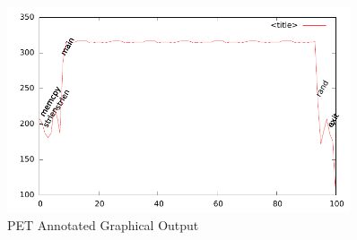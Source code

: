 \begin{figure}[htb]
    \centering
    \includegraphics[width=0.9\textwidth]{figs/annot.pdf}
    \caption{PET Annotated Graphical Output}
    \label{fig:annot}
\end{figure}

